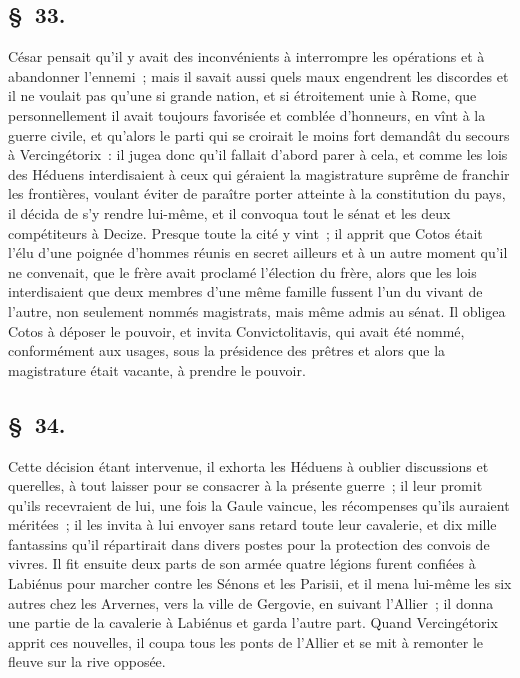 \documentclass[french,twoside]{book} %
\begin{document}
\subsection[{§ 33.}]{ \textsc{§ 33.} }
\noindent César pensait qu’il y avait des inconvénients à interrompre les opérations et à abandonner l’ennemi ; mais il savait aussi quels maux engendrent les discordes et il ne voulait pas qu’une si grande nation, et si étroitement unie à Rome, que personnellement il avait toujours favorisée et comblée d’honneurs, en vînt à la guerre civile, et qu’alors le parti qui se croirait le moins fort demandât du secours à Vercingétorix : il jugea donc qu’il fallait d’abord parer à cela, et comme les lois des Héduens interdisaient à ceux qui géraient la magistrature suprême de franchir les frontières, voulant éviter de paraître porter atteinte à la constitution du pays, il décida de s’y rendre lui-même, et il convoqua tout le sénat et les deux compétiteurs à Decize. Presque toute la cité y vint ; il apprit que Cotos était l’élu d’une poignée d’hommes réunis en secret ailleurs et à un autre moment qu’il ne convenait, que le frère avait proclamé l’élection du frère, alors que les lois interdisaient que deux membres d’une même famille fussent l’un du vivant de l’autre, non seulement nommés magistrats, mais même admis au sénat. Il obligea Cotos à déposer le pouvoir, et invita Convictolitavis, qui avait été nommé, conformément aux usages, sous la présidence des prêtres et alors que la magistrature était vacante, à prendre le pouvoir.
\subsection[{§ 34.}]{ \textsc{§ 34.} }
\noindent Cette décision étant intervenue, il exhorta les Héduens à oublier discussions et querelles, à tout laisser pour se consacrer à la présente guerre ; il leur promit qu’ils recevraient de lui, une fois la Gaule vaincue, les récompenses qu’ils auraient méritées ; il les invita à lui envoyer sans retard toute leur cavalerie, et dix mille fantassins qu’il répartirait dans divers postes pour la protection des convois de vivres. Il fit ensuite deux parts de son armée quatre légions furent confiées à Labiénus pour marcher contre les Sénons et les Parisii, et il mena lui-même les six autres chez les Arvernes, vers la ville de Gergovie, en suivant l’Allier ; il donna une partie de la cavalerie à Labiénus et garda l’autre part. Quand Vercingétorix apprit ces nouvelles, il coupa tous les ponts de l’Allier et se mit à remonter le fleuve sur la rive opposée.
\end{document}
